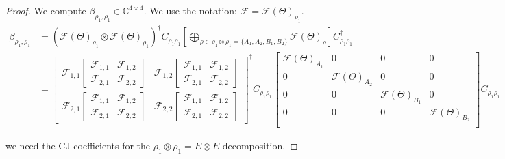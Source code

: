 \documentclass{article}
\begin{document}
\begin{proof}
We compute $\beta_{\rho_1, \rho_1} \in \mathbb{C}^{4 \times 4}$. We use the notation: $\mathcal{F} = \mathcal{F}(\Theta)_{\rho_1}$.
\begin{align*}
    \beta_{\rho_1, \rho_1}
    &= (\mathcal{F}(\Theta)_{\rho_1} \otimes \mathcal{F}(\Theta)_{\rho_1})^\dagger C_{{\rho_1} {\rho_1}}
    \left[
    \bigoplus_{\rho \in \rho_1 \otimes \rho_1=\{A_1, A_2, B_1, B_2\}}
        \mathcal{F}(\Theta)_\rho
    \right] C_{{\rho_1} {\rho_1}}^{\dagger} \\
    &= \left[\begin{array}{ll}
\mathcal{F}_{1,1}\left[\begin{array}{ll}
\mathcal{F}_{1,1} & \mathcal{F}_{1,2} \\
\mathcal{F}_{2,1} & \mathcal{F}_{2,2}
\end{array}\right] & \mathcal{F}_{1,2}\left[\begin{array}{ll}
\mathcal{F}_{1,1} & \mathcal{F}_{1,2} \\
\mathcal{F}_{2,1} & \mathcal{F}_{2,2}
\end{array}\right] \\
\mathcal{F}_{2,1}\left[\begin{array}{ll}
\mathcal{F}_{1,1} & \mathcal{F}_{1,2} \\
\mathcal{F}_{2,1} & \mathcal{F}_{2,2}
\end{array}\right] & \mathcal{F}_{2,2}\left[\begin{array}{ll}
\mathcal{F}_{1,1} & \mathcal{F}_{1,2} \\
\mathcal{F}_{2,1} & \mathcal{F}_{2,2}
\end{array}\right]
\end{array}\right]^\dagger C_{{\rho_1} {\rho_1}}
\begin{bmatrix}
     \mathcal{F}(\Theta)_{A_1} & 0 & 0 & 0\\
     0 & \mathcal{F}(\Theta)_{A_2} & 0 & 0\\
     0 & 0 & \mathcal{F}(\Theta)_{B_1} & 0\\
     0 & 0 & 0 & \mathcal{F}(\Theta)_{B_2}\\
\end{bmatrix}
C_{{\rho_1} {\rho_1}}^{\dagger}
\end{align*}

we need the CJ coefficients for the $\rho_1 \otimes \rho_1 = E \otimes E$ decomposition.





\end{proof}
\end{document}
